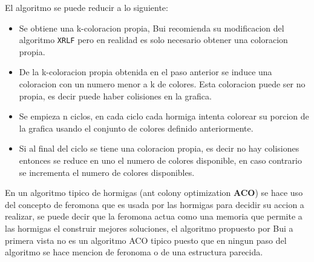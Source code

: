 \documentclass{article}
\begin{document}
El algoritmo se puede reducir a lo siguiente:
\begin{itemize}
  \item Se obtiene una k-coloracion propia, Bui recomienda su modificacion del algoritmo \texttt{XRLF} pero en realidad es solo necesario obtener una coloracion propia.
  \item De la k-coloracion propia obtenida en el paso anterior se induce una coloracion con un numero menor a k de colores. Esta coloracion puede ser no propia, es decir puede haber colisiones en la grafica.
  \item Se empieza n ciclos, en cada ciclo cada hormiga intenta colorear su porcion de la grafica usando el conjunto de colores definido anteriormente.
  \item Si al final del ciclo se tiene una coloracion propia, es decir no hay colisiones entonces se reduce en uno el numero de colores disponible, en caso contrario se incrementa el numero de colores disponibles.
\end{itemize}

En un algoritmo tipico de hormigas (ant colony optimization \textbf{ACO}) se hace uso del concepto de feromona que es usada por las hormigas para decidir su accion a realizar, se puede decir que la feromona actua como una memoria que permite a las hormigas el construir mejores soluciones, el algoritmo propuesto por Bui a primera vista no es un algoritmo ACO tipico puesto que en ningun paso del algoritmo se hace mencion de feronoma o de una estructura parecida.
\end{document}
